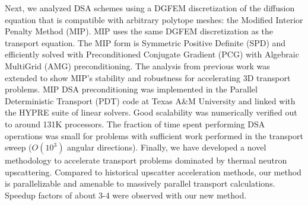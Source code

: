 Next, we analyzed DSA schemes using a DGFEM discretization of the diffusion equation that is compatible with arbitrary polytope meshes: the Modified Interior Penalty Method (MIP). MIP uses the same DGFEM discretization as the transport equation. The MIP form is Symmetric Positive Definite (SPD) and efficiently solved with Preconditioned Conjugate Gradient (PCG) with Algebraic MultiGrid (AMG) preconditioning. The analysis from previous work was extended to show MIP's stability and robustness for accelerating 3D transport problems. MIP DSA preconditioning was implemented in the Parallel Deterministic Transport (PDT) code at Texas A\&M University and linked with the HYPRE suite of linear solvers. Good scalability was numerically verified out to around 131K processors. The fraction of time spent performing DSA operations was small for problems with sufficient work performed in the transport sweep ($O(10^3)$ angular directions). Finally, we have developed a novel methodology to accelerate transport problems dominated by thermal neutron upscattering. Compared to historical upscatter acceleration methods, our method is parallelizable and amenable to massively parallel transport calculations. Speedup factors of about 3-4 were observed with our new method.

\pagebreak{}
